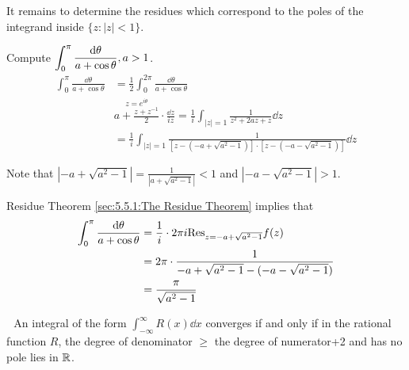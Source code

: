     It remains to determine the residues which correspond to the poles of the integrand inside  $ \{z:|z|<1\} $.
    \begin{example}
        Compute  $ \displaystyle\int_0^\pi\frac{\mathrm{d} \theta }{a+\cos\theta},a>1 $. 
        \begin{equation*}
            \begin{aligned}
                \int_0^\pi \frac{\dd \theta}{a+\cos\theta   }&=\frac{1 }{2}\int_0^{2\pi }\frac{\dd \theta}{a+\cos\theta}\\
                &\overset{z=e^{i\theta }}{a+\frac{z+z^{-1}}{2}}\cdot\frac{\dd z }{iz}=\frac{1 }{i }\int_{|z|=1}\frac{1 }{z^2+2az+z}\dd z\\
                &=\frac{1 }{i }\int_{|z|=1}\frac{1}{\left[z-(-a+\sqrt{a^2-1})\right]\cdot\left[z-(-a-\sqrt{a^2-1})\right]}\dd z
            \end{aligned}
        \end{equation*}
        
        Note that  $ |-a+\sqrt{a^2-1}|=\frac{1 }{|a+\sqrt{a^2-1}|}<1 $ and  $ |-a-\sqrt{a^2-1}|>1 $.

        Residue Theorem \ref{sec:5.5.1:The Residue Theorem} implies that 
        \begin{align*}
            \int_0^\pi \frac{\mathrm{d} \theta }{a+\cos\theta}&=\frac{1 }{i }\cdot 2\pi i\mathrm{Res}_{z=-a+\sqrt{a^2-1}}f(z)\\
            &=2\pi \cdot \frac{1}{-a+\sqrt{a^2-1}-(-a-\sqrt{a^2-1})}\\
            &=\frac{\pi    }{\sqrt{a^2-1}}
        \end{align*}
    \end{example} 
    \noindent{}\,\,\,\,An integral of the form  $ \int_{-\infty}^\infty R(x)\dd x $ converges if and only if in the rational function  $ R $, the degree of denominator  $ \geq $  the degree of numerator+2 and has no pole lies in  $ \mathbb R $.


